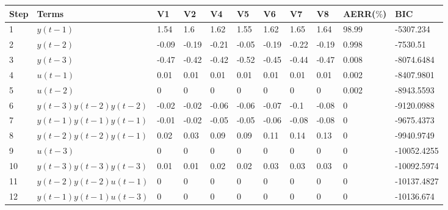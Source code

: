 \begin{tabular}{lllllllllll}
Step & Terms & V1 & V2 & V4 & V5 & V6 & V7 & V8 & AERR($\%$) & BIC \\ 
\hline 
1 & $y(t-1)$ & 1.54 & 1.6 & 1.62 & 1.55 & 1.62 & 1.65 & 1.64 & 98.99 & -5307.234 \\ 
2 & $y(t-2)$ & -0.09 & -0.19 & -0.21 & -0.05 & -0.19 & -0.22 & -0.19 & 0.998 & -7530.51 \\ 
3 & $y(t-3)$ & -0.47 & -0.42 & -0.42 & -0.52 & -0.45 & -0.44 & -0.47 & 0.008 & -8074.6484 \\ 
4 & $u(t-1)$ & 0.01 & 0.01 & 0.01 & 0.01 & 0.01 & 0.01 & 0.01 & 0.002 & -8407.9801 \\ 
5 & $u(t-2)$ & 0 & 0 & 0 & 0 & 0 & 0 & 0 & 0.002 & -8943.5593 \\ 
6 & $y(t-3)y(t-2)y(t-2)$ & -0.02 & -0.02 & -0.06 & -0.06 & -0.07 & -0.1 & -0.08 & 0 & -9120.0988 \\ 
7 & $y(t-1)y(t-1)y(t-1)$ & -0.01 & -0.02 & -0.05 & -0.05 & -0.06 & -0.08 & -0.08 & 0 & -9675.4373 \\ 
8 & $y(t-2)y(t-2)y(t-1)$ & 0.02 & 0.03 & 0.09 & 0.09 & 0.11 & 0.14 & 0.13 & 0 & -9940.9749 \\ 
9 & $u(t-3)$ & 0 & 0 & 0 & 0 & 0 & 0 & 0 & 0 & -10052.4255 \\ 
10 & $y(t-3)y(t-3)y(t-3)$ & 0.01 & 0.01 & 0.02 & 0.02 & 0.03 & 0.03 & 0.03 & 0 & -10092.5974 \\ 
11 & $y(t-2)y(t-2)u(t-1)$ & 0 & 0 & 0 & 0 & 0 & 0 & 0 & 0 & -10137.4827 \\ 
12 & $y(t-1)y(t-1)u(t-3)$ & 0 & 0 & 0 & 0 & 0 & 0 & 0 & 0 & -10136.674 \\ 
\hline 
\end{tabular}
